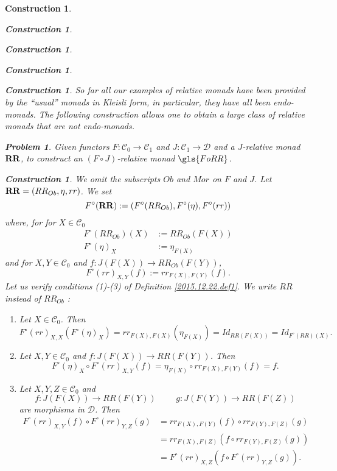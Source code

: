 \documentclass[onecolumn,12pt]{amsart}
\numberwithin{proposition}{subsection}
\newtheorem{problem}[proposition]{Problem}
\newtheorem{construction}[proposition]{Construction}
\newcommand{\sr}{\rightarrow}
\newcommand{\spc}{{\,\,\,\,\,\,\,}}
\newcommand{\RR}{{\bf RR}}
\newcommand{\C}{{\mathcal C}}
\newcommand{\D}{{\mathcal D}}
\begin{document}
\begin{construction}
\begin{construction}
\begin{construction}
\begin{construction}
\begin{construction}
So far all our examples of relative monads have been provided by the ``usual''
monads in Kleisli form, in particular, they have all been endo-monads.  The
following construction allows one to obtain a large class of relative monads
that are not endo-monads.
%
\begin{problem}\label{2017.02.24.prob1}
Given functors $F:\C_0\sr \C_1$ and $J:\C_1\sr\D$ and a $J$-relative monad $\RR$,
to construct an $(F\circ J)$-relative monad $\gls{FoRR}$.
\end{problem}
%
\begin{construction}\label{2017.02.24.constr1}\rm
We omit the subscripts $Ob$ and $Mor$ on $F$ and $J$. Let $\RR=(RR_{Ob},\eta,rr)$. We set
%
\begin{equation}
\label{2017.04.11.eq3}
F^{\circ}(\RR):=(F^{\circ}(RR_{Ob}), F^{\circ}(\eta), F^{\circ}(rr))
\end{equation}%
%
where, for for $X\in \C_0$
%
\begin{equation}
  \label{2017.04.11.eq1}
  \begin{split}
    F^{\circ}(RR_{Ob})(X)&:=RR_{Ob}(F(X))\\
    F^{\circ}(\eta)_X&:=\eta_{F(X)}
  \end{split}
\end{equation}%
%
and for $X,Y\in\C_0$ and $f:J(F(X))\sr RR_{Ob}(F(Y))$,
%
\begin{equation}
\label{2017.04.11.eq2}
F^{\circ}(rr)_{X,Y}(f):=rr_{F(X),F(Y)}(f).
\end{equation}%
%
Let us verify conditions (1)-(3) of Definition \ref{2015.12.22.def1}. We write
$RR$ instead of $RR_{Ob}$ :
%
\begin{enumerate}
\item Let $X\in\C_0$. Then 
%
$$F^{\circ}(rr)_{X,X}(F^{\circ}(\eta)_X)=rr_{F(X),F(X)}(\eta_{F(X)})=
Id_{RR(F(X))}=Id_{F^{\circ}(RR)(X)}.$$
%
\item Let $X,Y\in \C_0$ and $f:J(F(X))\sr RR(F(Y))$. Then
%
$$F^{\circ}(\eta)_X\circ F^{\circ}(rr)_{X,Y}(f)=\eta_{F(X)}\circ rr_{F(X),F(Y)}(f)=f.$$
%
\item Let $X,Y,Z\in \C_0$ and 
%
$$f:J(F(X))\sr RR(F(Y))\spc\spc g:J(F(Y))\sr RR(F(Z))$$
%
are morphisms in $\D$. Then
%
\begin{equation*}
  \begin{split}
    F^{\circ}(rr)_{X,Y}(f)\circ F^{\circ}(rr)_{Y,Z}(g)
      &= rr_{F(X),F(Y)}(f)\circ rr_{F(Y),F(Z)}(g)
    \\&= rr_{F(X),F(Z)}(f\circ rr_{F(Y),F(Z)}(g))
    \\&= F^{\circ}(rr)_{X,Z}(f\circ F^{\circ}(rr)_{Y,Z}(g)).

\end{split}
\end{equation*}
\end{enumerate}
\end{construction}
\end{construction}
\end{construction}
\end{construction}
\end{construction}
\end{construction}
\end{document}
